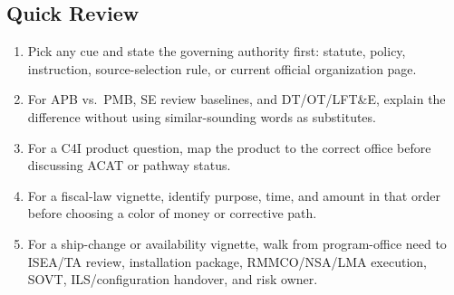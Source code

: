 \documentclass[../main.tex]{subfiles}
\begin{document}
\subsection{Quick Review}
\begin{enumerate}
  \item Pick any cue and state the governing authority first: statute, policy, instruction, source-selection rule, or current official organization page.
  \item For APB vs.\ PMB, SE review baselines, and DT/OT/LFT\&E, explain the difference without using similar-sounding words as substitutes.
  \item For a C4I product question, map the product to the correct office before discussing ACAT or pathway status.
  \item For a fiscal-law vignette, identify purpose, time, and amount in that order before choosing a color of money or corrective path.
  \item For a ship-change or availability vignette, walk from program-office need to ISEA/TA review, installation package, RMMCO/NSA/LMA execution, SOVT, ILS/configuration handover, and risk owner.
\end{enumerate}
\end{document}
